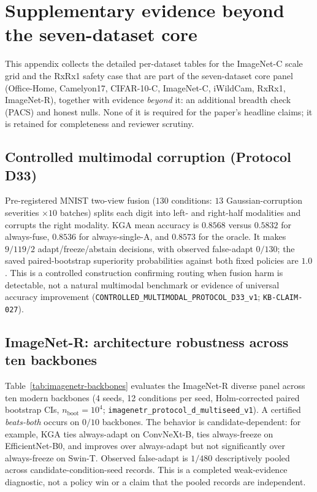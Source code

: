 \documentclass[conference]{IEEEtran}
\theoremstyle{plain}
\theoremstyle{definition}
\begin{document}
\section{Supplementary evidence beyond the seven-dataset core}\label{app:supp}
This appendix collects the detailed per-dataset tables for the ImageNet-C scale grid and the RxRx1 safety case that are part of the seven-dataset core panel (Office-Home, Camelyon17, CIFAR-10-C, ImageNet-C, iWildCam, RxRx1, ImageNet-R), together with evidence \emph{beyond} it: an additional breadth check (PACS) and honest nulls. None of it is required for the paper's headline claims; it is retained for completeness and reviewer scrutiny.

\subsection{Controlled multimodal corruption (Protocol D33)}
Pre-registered MNIST two-view fusion ($130$ conditions: $13$ Gaussian-corruption severities
$\times 10$ batches) splits each digit into left- and right-half modalities and corrupts the
right modality. \textsc{KGA} mean accuracy is $0.8568$ versus $0.5832$ for always-fuse,
$0.8536$ for always-single-A, and $0.8573$ for the oracle. It makes $9/119/2$
adapt/freeze/abstain decisions, with observed false-adapt $0/130$; the saved paired-bootstrap
superiority probabilities against both fixed policies are $1.0$. This is a controlled
construction confirming routing when fusion harm is detectable, not a natural multimodal
benchmark or evidence of universal accuracy improvement
(\texttt{CONTROLLED\_MULTIMODAL\_PROTOCOL\_D33\_v1}; \texttt{KB-CLAIM-027}).

\subsection{ImageNet-R: architecture robustness across ten backbones}\label{supp:imagenetr-backbones}
Table~\ref{tab:imagenetr-backbones} evaluates the ImageNet-R diverse panel across ten modern
backbones (4 seeds, 12 conditions per seed, Holm-corrected paired bootstrap CIs,
$n_{\mathrm{boot}}{=}10^4$; \texttt{imagenetr\_protocol\_d\_multiseed\_v1}). A certified
\emph{beats-both} occurs on $0/10$ backbones. The behavior is candidate-dependent: for example,
\textsc{KGA} ties always-adapt on ConvNeXt-B, ties always-freeze on EfficientNet-B0, and improves
over always-adapt but not significantly over always-freeze on Swin-T. Observed false-adapt is
$1/480$ descriptively pooled across candidate-condition-seed records. This is a completed
weak-evidence diagnostic, not a policy win or a claim that the pooled records are independent.
\end{document}
